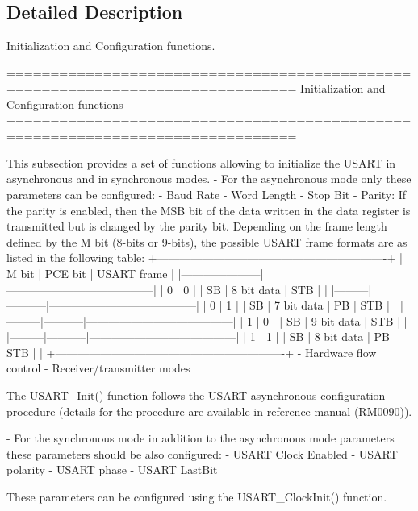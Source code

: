 \subsection{Detailed Description}
Initialization and Configuration functions. 

\begin{DoxyVerb} ===============================================================================
                  Initialization and Configuration functions
 ===============================================================================  

  This subsection provides a set of functions allowing to initialize the USART 
  in asynchronous and in synchronous modes.
   - For the asynchronous mode only these parameters can be configured: 
        - Baud Rate
        - Word Length 
        - Stop Bit
        - Parity: If the parity is enabled, then the MSB bit of the data written
          in the data register is transmitted but is changed by the parity bit.
          Depending on the frame length defined by the M bit (8-bits or 9-bits),
          the possible USART frame formats are as listed in the following table:
   +-------------------------------------------------------------+     
   |   M bit |  PCE bit  |            USART frame                |
   |---------------------|---------------------------------------|             
   |    0    |    0      |    | SB | 8 bit data | STB |          |
   |---------|-----------|---------------------------------------|  
   |    0    |    1      |    | SB | 7 bit data | PB | STB |     |
   |---------|-----------|---------------------------------------|  
   |    1    |    0      |    | SB | 9 bit data | STB |          |
   |---------|-----------|---------------------------------------|  
   |    1    |    1      |    | SB | 8 bit data | PB | STB |     |
   +-------------------------------------------------------------+            
        - Hardware flow control
        - Receiver/transmitter modes

  The USART_Init() function follows the USART  asynchronous configuration procedure
  (details for the procedure are available in reference manual (RM0090)).

  - For the synchronous mode in addition to the asynchronous mode parameters these 
    parameters should be also configured:
        - USART Clock Enabled
        - USART polarity
        - USART phase
        - USART LastBit
  
  These parameters can be configured using the USART_ClockInit() function.\end{DoxyVerb}
 


